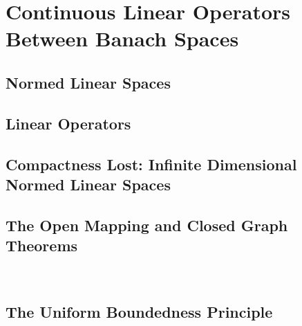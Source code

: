 \chapter{Continuous Linear Operators Between Banach Spaces}

\section{Normed Linear Spaces}
\section{Linear Operators}
\section{Compactness Lost: Infinite Dimensional Normed Linear Spaces}
\section{The Open Mapping and Closed Graph Theorems}\
\section{The Uniform Boundedness Principle}
